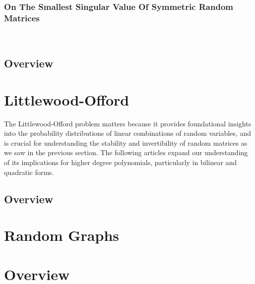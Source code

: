 \documentclass[12pt]{article}
\begin{document}
 

\subsubsection{On The Smallest Singular Value Of Symmetric Random Matrices}

\\\newline

\subsection{Overview}

\newpage
\section{Littlewood-Offord}

The Littlewood-Offord problem matters because it provides foundational insights into the probability distributions of linear combinations of random variables, and is crucial for understanding the stability and invertibility of random matrices as we saw in the previous section. The following articles expand our understanding of its implications for higher degree polynomials, particularly in bilinear and quadratic forms.



\subsection{Overview}

\section{Random Graphs}









\section{Overview}

\newpage
\printbibliography
\end{document}
